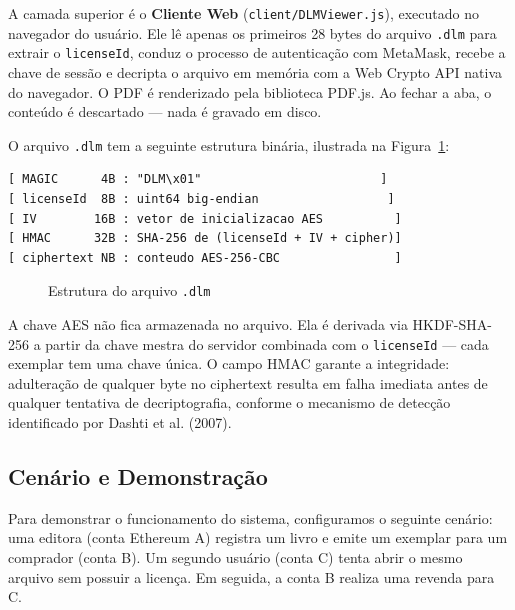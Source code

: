 \documentclass[12pt]{article}
\begin{document}
A camada superior é o \textbf{Cliente Web} (\texttt{client/DLMViewer.js}), executado no navegador do usuário. Ele lê apenas os primeiros 28 bytes do arquivo \texttt{.dlm} para extrair o \texttt{licenseId}, conduz o processo de autenticação com MetaMask, recebe a chave de sessão e decripta o arquivo em memória com a Web Crypto API nativa do navegador. O PDF é renderizado pela biblioteca PDF.js. Ao fechar a aba, o conteúdo é descartado — nada é gravado em disco.

O arquivo \texttt{.dlm} tem a seguinte estrutura binária, ilustrada na Figura~\ref{fig:dlm}:

\begin{verbatim}
[ MAGIC      4B : "DLM\x01"                         ]
[ licenseId  8B : uint64 big-endian                  ]
[ IV        16B : vetor de inicializacao AES          ]
[ HMAC      32B : SHA-256 de (licenseId + IV + cipher)]
[ ciphertext NB : conteudo AES-256-CBC                ]
\end{verbatim}

\begin{figure}[H]
\centering
\caption{Estrutura do arquivo \texttt{.dlm}}
\label{fig:dlm}
\end{figure}

A chave AES não fica armazenada no arquivo. Ela é derivada via HKDF-SHA-256 a partir da chave mestra do servidor combinada com o \texttt{licenseId} — cada exemplar tem uma chave única. O campo HMAC garante a integridade: adulteração de qualquer byte no ciphertext resulta em falha imediata antes de qualquer tentativa de decriptografia, conforme o mecanismo de detecção identificado por Dashti et al. (2007).

\subsection{Cenário e Demonstração}

Para demonstrar o funcionamento do sistema, configuramos o seguinte cenário: uma editora (conta Ethereum A) registra um livro e emite um exemplar para um comprador (conta B). Um segundo usuário (conta C) tenta abrir o mesmo arquivo sem possuir a licença. Em seguida, a conta B realiza uma revenda para C.
\end{document}
